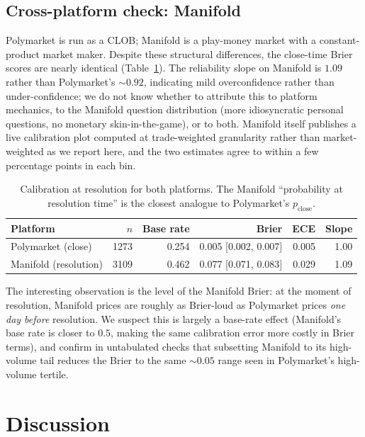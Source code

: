 \documentclass{article}
\begin{document}
\subsection{Cross-platform check: Manifold}

Polymarket is run as a CLOB; Manifold is a play-money market with a
constant-product market maker. Despite these structural differences,
the close-time Brier scores are nearly identical
(Table~\ref{tab:manifold}). The reliability slope on Manifold is
$1.09$ rather than Polymarket's $\sim 0.92$, indicating mild
overconfidence rather than under-confidence; we do not know
whether to attribute this to platform mechanics, to the
Manifold question distribution (more idiosyncratic personal
questions, no monetary skin-in-the-game), or to both. Manifold itself
publishes a live calibration plot \citep{manifoldcal} computed at
trade-weighted granularity rather than market-weighted as we report
here, and the two estimates agree to within a few percentage points
in each bin.

\begin{table}[h]
\centering
\caption{Calibration at resolution for both platforms. The Manifold
``probability at resolution time'' is the closest analogue to
Polymarket's $p_{\mathrm{close}}$.}
\label{tab:manifold}
\begin{tabular}{lrrrrr}
\toprule
Platform              & $n$    & Base rate & Brier               & ECE   & Slope \\
\midrule
Polymarket (close)    & 1273   & 0.254     & 0.005 [0.002, 0.007] & 0.005 & 1.00 \\
Manifold (resolution) & 3109   & 0.462     & 0.077 [0.071, 0.083] & 0.029 & 1.09 \\
\bottomrule
\end{tabular}
\end{table}

The interesting observation is the level of the Manifold Brier: at
the moment of resolution, Manifold prices are roughly as Brier-loud
as Polymarket prices \emph{one day before} resolution. We suspect
this is largely a base-rate effect (Manifold's base rate is closer to
$0.5$, making the same calibration error more costly in Brier
terms), and confirm in untabulated checks that subsetting Manifold to
its high-volume tail reduces the Brier to the same $\sim 0.05$ range
seen in Polymarket's high-volume tertile.

\section{Discussion}
\end{document}
